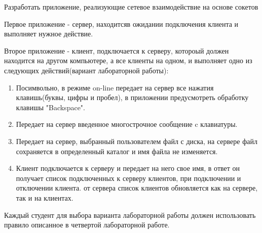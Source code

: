 \documentclass[a4paper,12pt]{article}
\begin{document}
  
  \begin{flushleft}
    Разработать приложение, реализующие сетевое взаимодействие на основе сокетов\\[0.4cm]
  \end{flushleft}

  \begin{flushleft}
   Первое приложение - сервер, находитсяв ожидании подключения клиента и выполняет нужное действие.\\[0.4cm]
  \end{flushleft}

  \begin{flushleft}
   Второе приложение - клиент, подключается к серверу, котороый должен находится на другом компьютере, а все клиенты на одном, и выполняет одно из следующих действий(вариант лабораторной работы):
  \end{flushleft}

  \begin{enumerate}
   \item Посимвольно, в режиме on-line передает на сервер все нажатия клавишь(буквы, цифры и пробел), в приложении предусмотреть обработку клавишы "Backspace".
   \item Передает на сервер введенное многострочное сообщение c клавиатуры.
   \item Передает на сервер, выбранный пользователем файл с диска, на сервере файл сохраняется в определенный каталог и имя файла не изменяется.
   \item Клиент подключается к серверу и передает на него свое имя, в ответ он получает список подключенных к серверу клиентов, при подключении и отключении клиента. от сервера список клиентов обновляется как на сервере, так и на клиентах.\\
  \end{enumerate}

  \begin{flushleft}
   Каждый студент для выбора варианта лабораторной работы должен использовать правило описанное в четвертой лабораторной работе.
  \end{flushleft}
\end{document}
